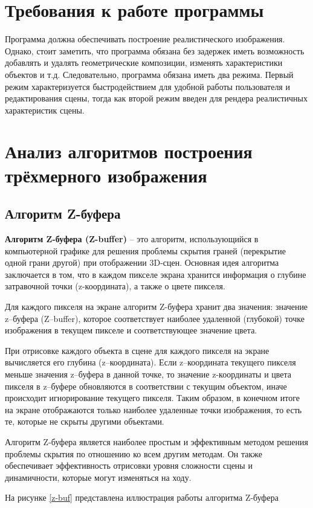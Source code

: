 \section{Требования к работе программы}
Программа должна обеспечивать построение реалистического изображения. Однако, стоит заметить, что программа обязана без задержек иметь возможность добавлять и удалять геометрические композиции, изменять характеристики объектов и т.д. Следовательно, программа обязана иметь два режима. Первый режим характеризуется быстродействием для удобной работы пользователя и редактирования сцены, тогда как второй режим введен для рендера реалистичных характеристик сцены.
\section{Анализ алгоритмов построения трёхмерного изображения}
	\subsection{Алгоритм Z-буфера}
	\textbf{Алгоритм Z-буфера (Z-buffer)} -- это алгоритм, использующийся в компьютерной графике для решения проблемы скрытия граней (перекрытие одной грани другой) при отображении 3D-сцен. Основная идея алгоритма заключается в том, что в каждом пикселе экрана хранится информация о глубине затравочной точки (z-координата), а также о цвете пикселя.
	
	
	Для каждого пикселя на экране алгоритм Z-буфера хранит два значения: значение z--буфера (Z--buffer), которое соответствует наиболее удаленной (глубокой) точке изображения в текущем пикселе и соответствующее значение цвета.
	
	
	При отрисовке каждого объекта в сцене для каждого пикселя на экране вычисляется его глубина (z--координата). Если z--координата текущего пикселя меньше значения z--буфера в данной точке, то значение z-координаты и цвета пикселя в z--буфере обновляются в соответствии с текущим объектом, иначе происходит игнорирование текущего пикселя. Таким образом, в конечном итоге на экране отображаются только наиболее удаленные точки изображения, то есть те, которые не скрыты другими объектами.
	
	
	Алгоритм Z-буфера является наиболее простым и эффективным методом решения проблемы скрытия по отношению ко всем другим методам. Он также обеспечивает эффективность отрисовки уровня сложности сцены и динамичности, которые могут изменяться на ходу.
	
	На рисунке \ref{z-buf} представлена иллюстрация работы алгоритма Z-буфера
	
